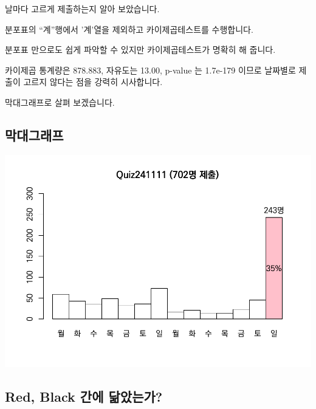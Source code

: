 \documentclass[
]{book}
\begin{document}
날마다 고르게 제출하는지 알아 보았습니다.

분포표의 ``계''행에서 '계'열을 제외하고 카이제곱테스트를 수행합니다.

분포표 만으로도 쉽게 파악할 수 있지만 카이제곱테스트가 명확히 해 줍니다.

카이제곱 통계량은 878.883, 자유도는 13.00, p-value 는 1.7e-179 이므로 날짜별로 제출이 고르지 않다는 점을 강력히 시사합니다.

막대그래프로 살펴 보겠습니다.

\subsection{막대그래프}\label{uxb9c9uxb300uxadf8uxb798uxd504-12}

\includegraphics{Quiz_report_2025_files/figure-latex/unnamed-chunk-350-1.pdf}

\subsection{Red, Black 간에 닮았는가?}\label{red-black-uxac04uxc5d0-uxb2eeuxc558uxb294uxac00-10}
\end{document}
